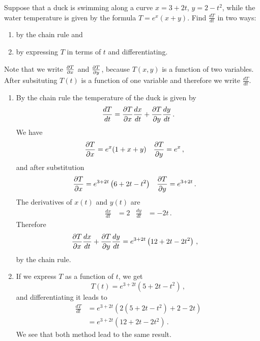 \begin{question}
Suppose that a duck is swimming along a curve $x=3+2t$, $y=2-t^2$, while the water temperature is given by the formula $T = e^x(x + y)$. Find 
$\frac{dT}{dt}$ in two ways:
\begin{enumerate}
\item
by the chain rule and
\item
by expressing $T$ in terms of $t$ and differentiating.
\end{enumerate}
\end{question}

\begin{solution}
Note that we write $\frac{\partial T}{\partial x}$ and $\frac{\partial T}{\partial y}$, because $T(x,y)$ is a function of two variables. After subsituting $T(t)$ is a function of one variable and therefore we write $\frac{dT}{dt}$.
\begin{enumerate}
\item
By the chain rule the temperature of the duck is given by
\[
\frac{dT}{dt} = \frac{\partial T}{\partial x}\frac{dx}{dt} + \frac{\partial T}{\partial y} \frac{dy}{dt}\,.
\]
We have
\begin{align*}
\frac{\partial T}{\partial x} &= e^x(1 + x + y) &
\frac{\partial T}{\partial y} &= e^x\,,
\end{align*}
and after substitution
\begin{align*}
\frac{\partial T}{\partial x} 
&= e^{3+2t}\left(6 + 2t - t^2\right) &
\frac{\partial T}{\partial y} 
&= e^{3 + 2t}\,.
\end{align*}
The derivatives of $x(t)$ and $y(t)$ are
\begin{align*}
\frac{dx}{dt} &= 2 &
\frac{dy}{dt} &= -2t \,.
\end{align*}
Therefore
\begin{align*}
\frac{\partial T}{\partial x}\frac{dx}{dt} + \frac{\partial T}{\partial y} \frac{dy}{dt}
&= e^{3+2t}\left(12 + 2t - 2t^2\right)\,,
\end{align*}
by the chain rule.
\item
If we express $T$ as a function of $t$, we get
\[
T(t) = e^{3+2t}\left(5 + 2t - t^2\right)\,,
\]
and differentiating it leads to
\begin{align*}
\frac{dT}{dt} &= e^{3+2t} \left( 2 \left(5 + 2t - t^2\right) + 2 - 2t \right) \\
&= e^{3+2t} \left(12 + 2t - 2t^2 \right)\,.
\end{align*}
We see that both method lead to the same result.
\end{enumerate}
\end{solution}

